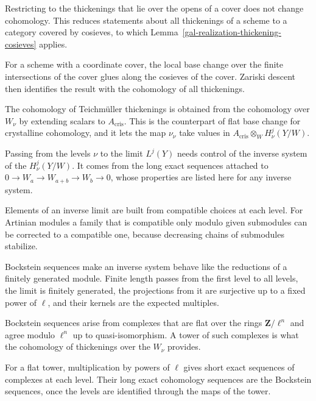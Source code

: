 Restricting to the thickenings that lie over the opens of a cover does not change cohomology. This reduces statements
about all thickenings of a scheme to a category covered by cosieves, to which
Lemma~\ref{gal-realization-thickening-cosieves} applies.

For a scheme with a coordinate cover, the local base change over the finite intersections of the cover glues along the
cosieves of the cover. Zariski descent then identifies the result with the cohomology of all thickenings.

The cohomology of Teichm\"uller thickenings is obtained from the cohomology over $W_\nu$ by extending scalars to
$A_{\mathrm{cris}}$. This is the counterpart of flat base change for crystalline cohomology, and it lets the map
$\nu_\nu$ take values in $A_{\mathrm{cris}}\otimes_WH^j_\nu(Y/W)$.

Passing from the levels $\nu$ to the limit $L^j(Y)$ needs control of the inverse system of the $H^j_\nu(Y/W)$. It
comes from the long exact sequences attached to $0\to W_a\to W_{a+b}\to W_b\to0$, whose properties are listed here for
any inverse system.

Elements of an inverse limit are built from compatible choices at each level. For Artinian modules a family that is
compatible only modulo given submodules can be corrected to a compatible one, because decreasing chains of submodules
stabilize.

Bockstein sequences make an inverse system behave like the reductions of a finitely generated module. Finite length
passes from the first level to all levels, the limit is finitely generated, the projections from it are surjective up
to a fixed power of $\ell$, and their kernels are the expected multiples.

Bockstein sequences arise from complexes that are flat over the rings $\mathbf Z/\ell^n$ and agree modulo $\ell^n$ up
to quasi-isomorphism. A tower of such complexes is what the cohomology of thickenings over the $W_\nu$ provides.

For a flat tower, multiplication by powers of $\ell$ gives short exact sequences of complexes at each level. Their long
exact cohomology sequences are the Bockstein sequences, once the levels are identified through the maps of the tower.

